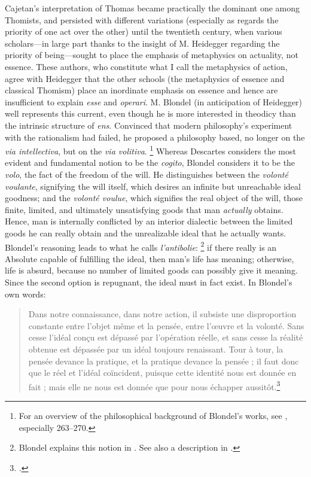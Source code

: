 Cajetan's interpretation of Thomas became practically the dominant one among Thomists, and persisted with different variations (especially as regards the priority of one act over the other) until the twentieth century, when various scholars---in large part thanks to the insight of M. Heidegger regarding the priority of being---sought to place the emphasis of metaphysics on actuality, not essence. These authors, who constitute what I call the metaphysics of action, agree with Heidegger that the other schools (the metaphysics of essence and classical Thomism) place an inordinate emphasis on essence and hence are insufficient to explain \emph{esse} and \emph{operari}.
M. Blondel (in anticipation of Heidegger) well represents this current, even though he is more interested in theodicy than the intrinsic structure of \emph{ens}. Convinced that modern philosophy's experiment with the rationalism had failed, he proposed a philosophy based, no longer on the \emph{via intellectiva}, but on the \emph{via volitiva}.%
%
\footnote{For an overview of the philosophical background of Blondel's works, see \cite{nicolosi:azione}, especially 263--270.}
%
 Whereas Descartes considers the most evident and fundamental notion to be the \emph{cogito}, Blondel considers it to be the \emph{volo}, the fact of the freedom of the will. He distinguishes between the \emph{volonté voulante}, signifying the will itself, which desires an infinite but unreachable ideal goodness; and the \emph{volonté voulue}, which signifies the real object of the will, those finite, limited, and ultimately unsatisfying goods that man \emph{actually} obtains. Hence, man is internally conflicted by an interior dialectic between the limited goods he can really obtain and the unrealizable ideal that he actually wants. Blondel's reasoning leads to what he calls \emph{l'antibolie}:%
%
\footnote{Blondel explains this notion in \cite[323--324]{blondel:action}. See also a description in \cite[274--276]{nicolosi:azione}.}
%
if there really is an Absolute capable of fulfilling the ideal, then man's life has meaning; otherwise, life is absurd, because no number of limited goods can possibly give it meaning. Since the second option is repugnant, the ideal must in fact exist. In Blondel's own words:
%
\begin{quotation}
Dans notre connaissance, dans notre action, il subsiste une disproportion constante
entre l'objet même et la pensée, entre l'œuvre et la volonté. Sans cesse l'idéal conçu
est dépassé par l'opération réelle, et sans cesse la réalité obtenue est dépassée par
un idéal toujours renaissant. Tour à tour, la pensée devance la pratique, et la
pratique devance la pensée ; il faut donc que le réel et l'idéal coïncident, puisque cette identité nous est donnée en fait ; mais elle ne nous est donnée que pour nous échapper aussitôt.\footcite[344--345]{blondel:action}
\end{quotation}
